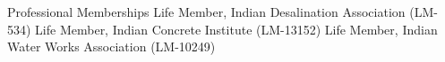 \begin{rubric}{Professional Memberships}
\entry*{} Life Member, Indian Desalination Association (LM-534)
\entry*{} Life Member, Indian Concrete Institute (LM-13152)
\entry*{} Life Member, Indian Water Works Association (LM-10249)
\end{rubric}